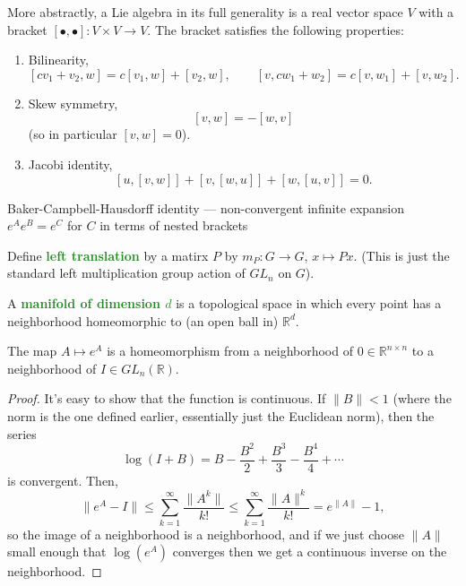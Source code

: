 \documentclass[10pt]{scrartcl}
\providecommand{\RR}{\mathbb R}
\providecommand{\ii}{\item}
\providecommand{\vocab}[1]{{\textbf{\textcolor{ForestGreen}{#1}}}}
\begin{document}
\begin{definition}
	More abstractly, a Lie algebra in its full generality is
	a real vector space $V$ with a bracket
	$[\bullet,\bullet]\colon V\times V\to V$.
	The bracket satisfies the following properties:
	\begin{enumerate}[(1)]
		\ii Bilinearity,
		\[[cv_1 + v_2, w] = c[v_1, w] + [v_2, w],\qquad
		[v, cw_1 + w_2] = c[v, w_1] + [v, w_2].\]
		\ii Skew symmetry,
		\[[v,w] = -[w,v]\]
		(so in particular $[v,w] = 0$).
		\ii Jacobi identity,
		\[[u,[v,w]] + [v,[w,u]] + [w,[u,v]] = 0.\]
	\end{enumerate}
\end{definition}

\begin{remark}
	Baker-Campbell-Hausdorff identity --- non-convergent infinite expansion
	$e^Ae^B = e^C$ for $C$ in terms of nested brackets
\end{remark}

\begin{definition}
	Define \vocab{left translation} by a matirx $P$
	by $m_P\colon G\to G$, $x\mapsto Px$.
	(This is just the standard left multiplication group action
	of $GL_n$ on $G$).
\end{definition}

\begin{definition}
	A \vocab{manifold of dimension $d$} is a topological space
	in which every point has a neighborhood homeomorphic to
	(an open ball in) $\RR^d$.
\end{definition}

\begin{lemma}
	The map $A\mapsto e^A$ is a homeomorphism from
	a neighborhood of $0\in\RR^{n\times n}$ to a neighborhood of
	$I\in GL_n(\RR)$.
\end{lemma}

\begin{proof}
	It's easy to show that the function is continuous.
	If $\|B\| < 1$ (where the norm is the one defined earlier,
	essentially just the Euclidean norm), then the series
	\[\log(I + B) = B - \frac{B^2}{2} + \frac{B^3}{3} - \frac{B^4}{4} +\cdots\]
	is convergent. Then,
	\[\|e^A - I\| \le \sum_{k=1}^\infty \frac{\|A^k\|}{k!}
	\le \sum_{k=1}^\infty \frac{\|A\|^k}{k!} = e^{\|A\|}-1,\]
	so the image of a neighborhood is a neighborhood,
	and if we just choose $\|A\|$ small enough that $\log(e^A)$ converges
	then we get a continuous inverse on the neighborhood.
\end{proof}
\end{document}
